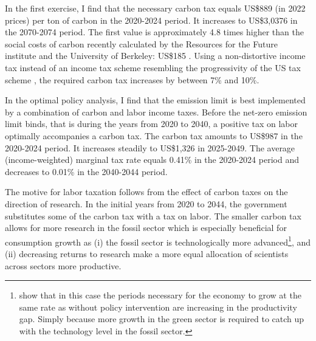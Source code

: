 In the first exercise, I find that the necessary carbon tax equals US\$889 (in 2022 prices) per ton of carbon in the 2020-2024 period. It increases to US\$3,0376 in the 2070-2074 period. The first value is approximately 4.8 times higher than the social costs of carbon recently calculated by the Resources for the Future institute and the University of Berkeley: US\$185 \citep{RFF}. Using a non-distortive income tax instead of an income tax scheme resembling the progressivity of the US tax scheme \citep[taken from][]{Heathcote2017OptimalFramework},  the required carbon tax increases by between 7\% and 10\%. 




In the optimal policy analysis, I find that the emission limit is best implemented by a combination of carbon and labor income taxes. 
Before the net-zero emission limit binds, that is during the years from 2020 to 2040, a positive tax on labor optimally accompanies a carbon tax. 
The carbon tax amounts to US\$987 in the 2020-2024 period. It increases steadily to US\$1,326 in 2025-2049. The average (income-weighted) marginal tax rate equals 0.41\% in the 2020-2024 period and decreases to 0.01\% in the 2040-2044 period.


The motive for labor taxation follows from the effect of carbon taxes on the direction of research. In the initial years from 2020 to 2044, the government substitutes some of the carbon tax with a tax on labor. The smaller carbon tax allows for more research in the fossil sector which is especially beneficial for consumption growth as (i) the fossil sector is technologically more advanced\footnote{\citep{Acemoglu2012TheChange} show that in this case the periods necessary for the economy to grow at the same rate as without policy intervention are increasing in the productivity gap. Simply because more growth in the green sector is required  to catch up with the technology level in the fossil sector.}, and (ii) decreasing returns to research make a more equal allocation of scientists across sectors more productive. 
 
